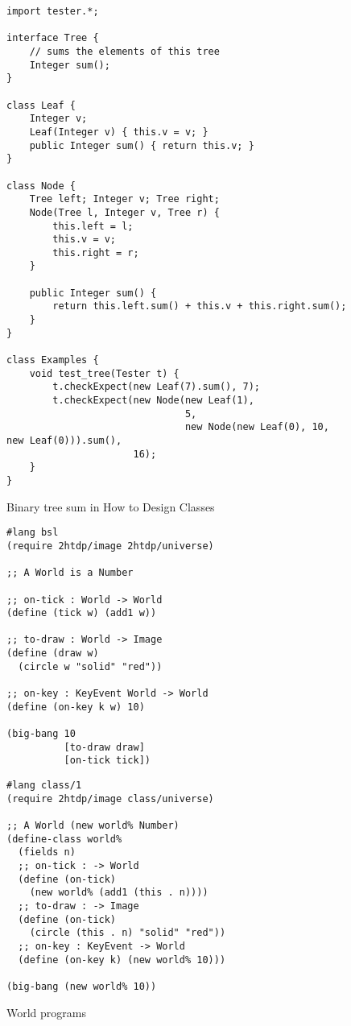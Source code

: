\documentclass[submission,copyright]{eptcs}
\begin{document}
\begin{figure}
\begin{verbatim}
import tester.*;

interface Tree {
    // sums the elements of this tree
    Integer sum();
}

class Leaf {
    Integer v;
    Leaf(Integer v) { this.v = v; }
    public Integer sum() { return this.v; }
}

class Node {
    Tree left; Integer v; Tree right;
    Node(Tree l, Integer v, Tree r) {
        this.left = l;
        this.v = v;
        this.right = r;
    }

    public Integer sum() {
        return this.left.sum() + this.v + this.right.sum();
    }
}

class Examples {
    void test_tree(Tester t) {
        t.checkExpect(new Leaf(7).sum(), 7);
        t.checkExpect(new Node(new Leaf(1),
                               5, 
                               new Node(new Leaf(0), 10, new Leaf(0))).sum(),
                      16);
    }
}
\end{verbatim}
\caption{Binary tree sum in How to Design Classes}
\end{figure}


\begin{figure}
\begin{minipage}[t]{3.4in}
\begin{verbatim}
#lang bsl
(require 2htdp/image 2htdp/universe)

;; A World is a Number

;; on-tick : World -> World
(define (tick w) (add1 w))

;; to-draw : World -> Image
(define (draw w)
  (circle w "solid" "red"))

;; on-key : KeyEvent World -> World
(define (on-key k w) 10)

(big-bang 10
          [to-draw draw]
          [on-tick tick])
\end{verbatim}
\end{minipage}
\begin{minipage}[t]{3in}
\begin{verbatim}
#lang class/1
(require 2htdp/image class/universe)

;; A World (new world% Number)
(define-class world%
  (fields n)
  ;; on-tick : -> World
  (define (on-tick)
    (new world% (add1 (this . n))))
  ;; to-draw : -> Image
  (define (on-tick) 
    (circle (this . n) "solid" "red"))
  ;; on-key : KeyEvent -> World
  (define (on-key k) (new world% 10)))
  
(big-bang (new world% 10))
\end{verbatim}
\end{minipage}
\caption{World programs}
\label{fig:world}
\end{figure}
\end{document}
